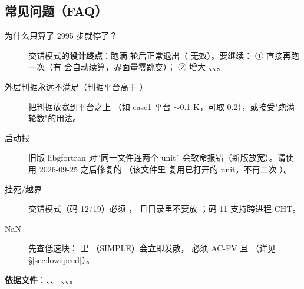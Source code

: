 \subsection{常见问题（FAQ）}
\begin{description}
  \item[为什么只算了 2995 步就停了？] 交错模式的\textbf{设计终点}：跑满
     轮后正常退出（ 无效）。要继续：
    ① 直接再跑一次（有  会自动续算，界面量零跳变）；
    ② 增大 、、。
  \item[外层判据永远不满足（判据平台高于 ）] 把判据放宽到平台之上
    （如 case1 平台 $\sim$0.1 K，可取 0.2），或接受"跑满轮数"的用法。
  \item[启动报 ] 旧版 libgfortran 对“同一文件连两个 unit”
    会致命报错（新版放宽）。请使用 2026-09-25 之后修复的 
    （该文件里  复用已打开的 unit，不再二次 ）。
  \item[ 挂死/越界] 交错模式（码 12/19）必须 ，
    且目录里不要放 ；码 11 支持跨进程 CHT。
  \item[NaN] 先查低速块： 里 （SIMPLE）会立即发散，
    必须 AC-FV 且 （详见 \S\ref{sec:lowspeed}）。
\end{description}

\noindent\textbf{依据文件}：、、
、、。

